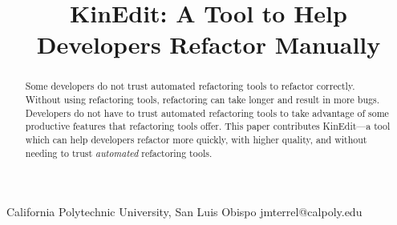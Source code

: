 \documentclass{sigplanconf}
\begin{document}
\setlength{\pdfpageheight}{\paperheight}
\setlength{\pdfpagewidth}{\paperwidth}




\permissiontopublish             %


\newcommand{\pname}{KinEdit}

\title{\pname{}: A Tool to Help Developers Refactor Manually}

           {California Polytechnic University, San Luis Obispo}
           {jmterrel@calpoly.edu}

\maketitle

\begin{abstract}
Some developers do not trust automated refactoring tools to refactor correctly.
Without using refactoring tools, refactoring can take longer and result
in more bugs. Developers do not have to trust automated refactoring tools to
take advantage of some productive features that refactoring tools offer.
This paper contributes \pname{}---a tool which can help developers refactor more
quickly, with higher quality, and without needing to trust \textit{automated}
refactoring tools.
\end{abstract}

\end{document}
